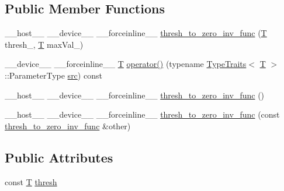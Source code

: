 \subsection*{Public Member Functions}
\begin{DoxyCompactItemize}
\item 
\-\_\-\-\_\-host\-\_\-\-\_\- \-\_\-\-\_\-device\-\_\-\-\_\- \-\_\-\-\_\-forceinline\-\_\-\-\_\- \hyperlink{structcv_1_1gpu_1_1device_1_1thresh__to__zero__inv__func_a6a81867b49325ad6d04015e065f6a20f}{thresh\-\_\-to\-\_\-zero\-\_\-inv\-\_\-func} (\hyperlink{calib3d_8hpp_a3efb9551a871ddd0463079a808916717}{T} thresh\-\_\-, \hyperlink{calib3d_8hpp_a3efb9551a871ddd0463079a808916717}{T} max\-Val\-\_)
\item 
\-\_\-\-\_\-device\-\_\-\-\_\- \-\_\-\-\_\-forceinline\-\_\-\-\_\- \hyperlink{calib3d_8hpp_a3efb9551a871ddd0463079a808916717}{T} \hyperlink{structcv_1_1gpu_1_1device_1_1thresh__to__zero__inv__func_adb45d15e46179299a9f3f8f57962bc32}{operator()} (typename \hyperlink{structcv_1_1gpu_1_1device_1_1TypeTraits}{Type\-Traits}$<$ \hyperlink{calib3d_8hpp_a3efb9551a871ddd0463079a808916717}{T} $>$\-::Parameter\-Type \hyperlink{legacy_8hpp_a371cd109b74033bc4366f584edd3dacc}{src}) const 
\item 
\-\_\-\-\_\-host\-\_\-\-\_\- \-\_\-\-\_\-device\-\_\-\-\_\- \-\_\-\-\_\-forceinline\-\_\-\-\_\- \hyperlink{structcv_1_1gpu_1_1device_1_1thresh__to__zero__inv__func_a5594d55566830a2d64d2e084ab0f3c1c}{thresh\-\_\-to\-\_\-zero\-\_\-inv\-\_\-func} ()
\item 
\-\_\-\-\_\-host\-\_\-\-\_\- \-\_\-\-\_\-device\-\_\-\-\_\- \-\_\-\-\_\-forceinline\-\_\-\-\_\- \hyperlink{structcv_1_1gpu_1_1device_1_1thresh__to__zero__inv__func_a4ba8550e91c832c618b3595054da3558}{thresh\-\_\-to\-\_\-zero\-\_\-inv\-\_\-func} (const \hyperlink{structcv_1_1gpu_1_1device_1_1thresh__to__zero__inv__func}{thresh\-\_\-to\-\_\-zero\-\_\-inv\-\_\-func} \&other)
\end{DoxyCompactItemize}
\subsection*{Public Attributes}
\begin{DoxyCompactItemize}
\item 
const \hyperlink{calib3d_8hpp_a3efb9551a871ddd0463079a808916717}{T} \hyperlink{structcv_1_1gpu_1_1device_1_1thresh__to__zero__inv__func_abeb1e635f27b1b1b58c6cebf0e86908a}{thresh}
\end{DoxyCompactItemize}


